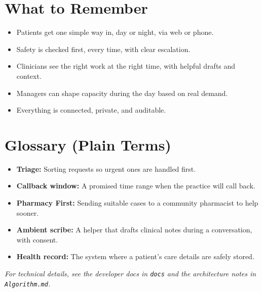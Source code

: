 \documentclass[11pt]{article}
\begin{document}
\section*{What to Remember}
\begin{itemize}
  \item Patients get one simple way in, day or night, via web or phone.
  \item Safety is checked first, every time, with clear escalation.
  \item Clinicians see the right work at the right time, with helpful drafts and context.
  \item Managers can shape capacity during the day based on real demand.
  \item Everything is connected, private, and auditable.
\end{itemize}

\section*{Glossary (Plain Terms)}
\begin{itemize}
  \item \textbf{Triage:} Sorting requests so urgent ones are handled first.
  \item \textbf{Callback window:} A promised time range when the practice will call back.
  \item \textbf{Pharmacy First:} Sending suitable cases to a community pharmacist to help sooner.
  \item \textbf{Ambient scribe:} A helper that drafts clinical notes during a conversation, with consent.
  \item \textbf{Health record:} The system where a patient's care details are safely stored.
\end{itemize}

\vspace{1em}
\noindent\textit{For technical details, see the developer docs in \texttt{docs\/} and the architecture notes in \texttt{Algorithm.md}.}
\end{document}
